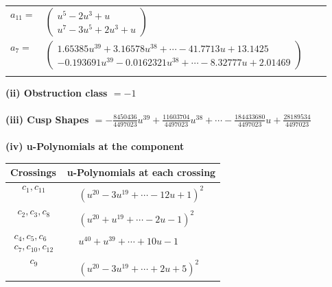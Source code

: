 \documentclass[1p]{elsarticle_modified}
\theoremstyle{definition}
\begin{document}
\begin{tabular}{m{7pt} m{180pt} m{7pt} m{180pt} }
\flushright $a_{11}=$&$\begin{pmatrix}u^5-2 u^3+u\\u^7-3 u^5+2 u^3+u\end{pmatrix}$ \\
\flushright $a_{7}=$&$\begin{pmatrix}1.65385 u^{39}+3.16578 u^{38}+\cdots-41.7713 u+13.1425\\-0.193691 u^{39}-0.0162321 u^{38}+\cdots-8.32777 u+2.01469\end{pmatrix}$\\&\end{tabular}
\flushleft \textbf{(ii) Obstruction class $= -1$}\\~\\
\flushleft \textbf{(iii) Cusp Shapes $= -\frac{8450436}{4497023} u^{39}+\frac{11603704}{4497023} u^{38}+\cdots-\frac{184433680}{4497023} u+\frac{28189534}{4497023}$}\\~\\
\newpage\renewcommand{\arraystretch}{1}
\flushleft \textbf{(iv) u-Polynomials at the component}\newline \\
\begin{tabular}{m{50pt}|m{274pt}}
Crossings & \hspace{64pt}u-Polynomials at each crossing \\
\hline $$\begin{aligned}c_{1},c_{11}\end{aligned}$$&$\begin{aligned}
&(u^{20}-3 u^{19}+\cdots-12 u+1)^{2}
\end{aligned}$\\
\hline $$\begin{aligned}c_{2},c_{3},c_{8}\end{aligned}$$&$\begin{aligned}
&(u^{20}+u^{19}+\cdots-2 u-1)^{2}
\end{aligned}$\\
\hline $$\begin{aligned}c_{4},c_{5},c_{6}\\c_{7},c_{10},c_{12}\end{aligned}$$&$\begin{aligned}
&u^{40}+u^{39}+\cdots+10 u-1
\end{aligned}$\\
\hline $$\begin{aligned}c_{9}\end{aligned}$$&$\begin{aligned}
&(u^{20}-3 u^{19}+\cdots+2 u+5)^{2}
\end{aligned}$\\
\hline
\end{tabular}\\~\\
\end{document}
